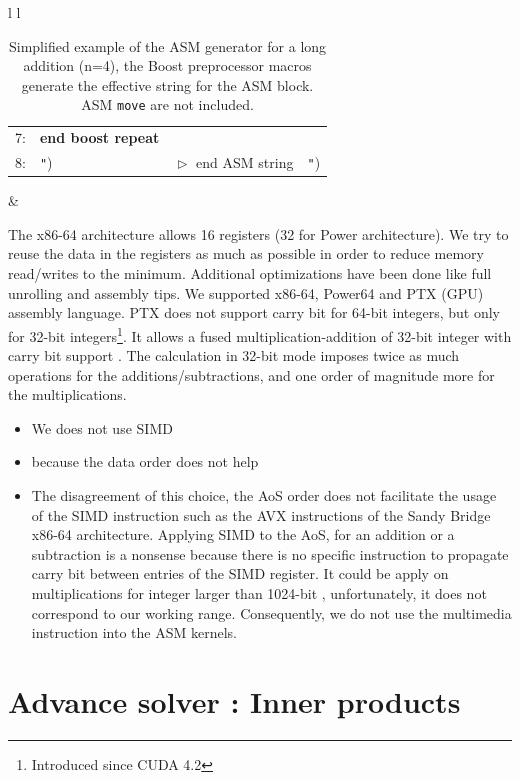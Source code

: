 \documentclass[oribibl]{llncs2e/llncs}
\begin{document}
\begin{table}[h]
\begin{center}
\begin{tabular}{l l}
\begin{tabular}{l l l l }
                               \tiny{7:} &  \textbf{end boost repeat} &  &   \\                            
                               \tiny{8:} &  \texttt{"})  &  $\vartriangleright$ end ASM string & \texttt{"})\\
                          \end{tabular} &  \\ \hline
		 \end{tabular} 
		 \caption{Simplified  example of the ASM generator for a long addition (n=4), the Boost preprocessor macros generate the effective string for the ASM block. ASM \texttt{move} are not included. \label{ASMGENERATOR}  }
	\end{center}
\end{table} 

The x86-64 architecture allows 16 registers (32 for Power architecture). We try to reuse the data in the registers as much as possible in order to reduce memory read/writes to the minimum.  Additional optimizations have been done like full unrolling and assembly tips. We  supported  x86-64, Power64 and PTX (GPU) assembly language. PTX does not support carry bit for 64-bit integers, but only for 32-bit integers\footnote{Introduced since CUDA 4.2}.  
It allows a fused multiplication-addition of 32-bit integer  with carry bit support \cite{CUDAasm}.  The calculation in 32-bit mode imposes twice as much operations for the additions/subtractions, and one order of magnitude more for the multiplications. 

\begin{itemize}
\item  We does not use SIMD 
\item because the data order does not help
\item 
The disagreement  of this choice, the AoS order does not facilitate the usage of the SIMD instruction such as the AVX instructions of the Sandy Bridge x86-64 architecture.
Applying SIMD to the AoS, for an addition or a subtraction is a nonsense because there is no specific instruction to propagate carry bit between entries of the SIMD register.
It could be  apply  on multiplications for integer  larger than 1024-bit \cite{SIMD}, unfortunately, it does not correspond to our working range. Consequently, we do not 
use the multimedia instruction into the ASM kernels.
\end{itemize}

\section{Advance solver : Inner products}
\end{document}
